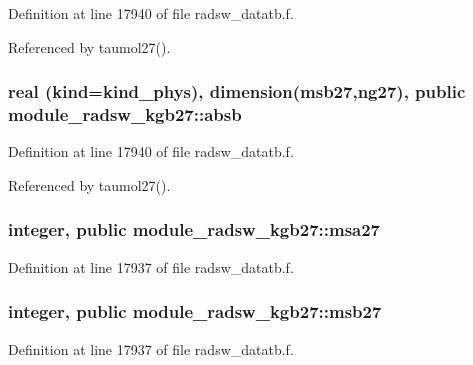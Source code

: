 Definition at line 17940 of file radsw\+\_\+datatb.\+f.



Referenced by taumol27().

\subsubsection[{\texorpdfstring{absb}{absb}}]{\setlength{\rightskip}{0pt plus 5cm}real (kind=kind\+\_\+phys), dimension({\bf msb27},ng27), public module\+\_\+radsw\+\_\+kgb27\+::absb}\hypertarget{namespacemodule__radsw__kgb27_a8edb349c908e6950e0d18f293dd1b6ea}{}\label{namespacemodule__radsw__kgb27_a8edb349c908e6950e0d18f293dd1b6ea}


Definition at line 17940 of file radsw\+\_\+datatb.\+f.



Referenced by taumol27().

\subsubsection[{\texorpdfstring{msa27}{msa27}}]{\setlength{\rightskip}{0pt plus 5cm}integer, public module\+\_\+radsw\+\_\+kgb27\+::msa27}\hypertarget{namespacemodule__radsw__kgb27_abdab838f66aba14b64bce733f797cf26}{}\label{namespacemodule__radsw__kgb27_abdab838f66aba14b64bce733f797cf26}


Definition at line 17937 of file radsw\+\_\+datatb.\+f.

\subsubsection[{\texorpdfstring{msb27}{msb27}}]{\setlength{\rightskip}{0pt plus 5cm}integer, public module\+\_\+radsw\+\_\+kgb27\+::msb27}\hypertarget{namespacemodule__radsw__kgb27_a3b2e57a0d4596aead5cad5aaca74850d}{}\label{namespacemodule__radsw__kgb27_a3b2e57a0d4596aead5cad5aaca74850d}


Definition at line 17937 of file radsw\+\_\+datatb.\+f.

